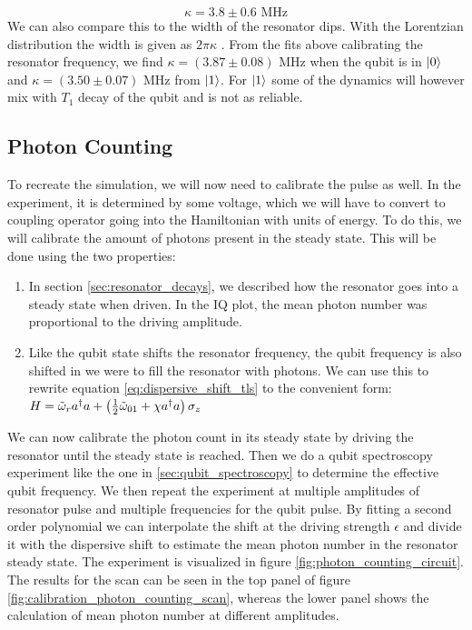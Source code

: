 \begin{equation}
    \kappa = 3.8 \pm 0.6 \text{ MHz}
\end{equation}
We can also compare this to the width of the resonator dips. With the Lorentzian distribution the width is given as $2 \pi \kappa$ \cite{krantz_quantum_2019}. From the fits above calibrating the resonator frequency, we find  $\kappa = (3.87 \pm 0.08) \text{ MHz}$ when the qubit is in $\ket{0}$ and $\kappa = (3.50 \pm 0.07) \text{ MHz}$ from $\ket{1}$. For $\ket{1}$ some of the dynamics will however mix with $T_1$ decay of the qubit and is not as reliable.   

\subsection{Photon Counting}
To recreate the simulation, we will now need to calibrate the pulse as well. In the experiment, it is determined by some voltage, which we will have to convert to coupling operator going into the Hamiltonian with units of energy. To do this, we will calibrate the amount of photons present in the steady state. This will be done using the two properties:
\begin{enumerate}
    \item In section \ref{sec:resonator_decays}, we described how the resonator goes into a steady state when driven. In the IQ plot, the mean photon number was proportional to the driving amplitude. 
    \item Like the qubit state shifts the resonator frequency, the qubit frequency is also shifted in we were to fill the resonator with photons. We can use this to rewrite equation \ref{eq:dispersive_shift_tls} to the convenient form: $H = \Tilde{\omega}_r a^\dagger a  + \left(\frac12 \Tilde{\omega}_{01} + \chi a^\dagger a\right)  \sigma_z$
\end{enumerate}
We can now calibrate the photon count in its steady state by driving the resonator until the steady state is reached. Then we do a qubit spectroscopy experiment like the one in \ref{sec:qubit_spectroscopy} to determine the effective qubit frequency. We then repeat the experiment at multiple amplitudes of resonator pulse and multiple frequencies for the qubit pulse. By fitting a second order polynomial we can interpolate the shift at the driving strength $\epsilon$ and divide it with the dispersive shift to estimate the mean photon number in the resonator steady state. The experiment is visualized in figure \ref{fig:photon_counting_circuit}. The results for the scan can be seen in the top panel of figure \ref{fig:calibration_photon_counting_scan}, whereas the lower panel shows the calculation of mean photon number at different amplitudes.  
